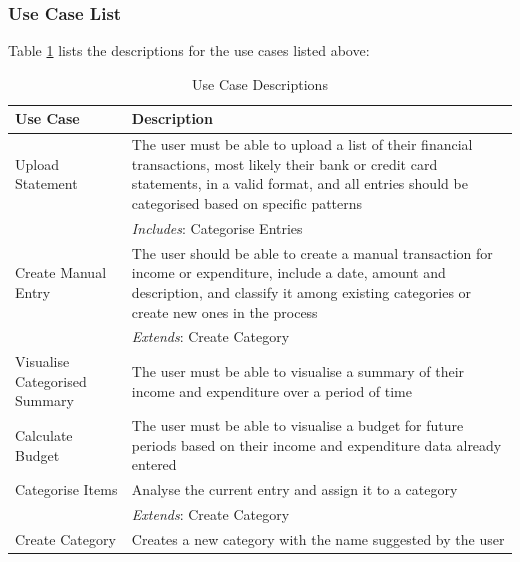 \subsubsection{Use Case List} \label{sec:Requirements.FunctionalRequirements.UseCaseList}
Table \ref{tab:UseCaseDescriptions} lists the descriptions for the use cases
listed above:
\begin{table}[ht!]
  \centering
  \begin{tabular}{|p{4cm}|p{12cm}|}
    \hline
    \textbf{Use Case}&\textbf{Description}\\
    \hline
    Upload Statement&The user must be able to upload a list of their
                     financial transactions, most likely their bank
                     or credit card statements, in a valid format, and all
                     entries should be categorised based on specific patterns\\
                    &\emph{Includes}: Categorise Entries\\
    \hline
    Create Manual Entry&The user should be able to create a manual transaction for
                        income or expenditure, include a date, amount and
                        description, and classify it among existing categories
                        or create new ones in the
                        process\\
                        &\emph{Extends}: Create Category\\
    \hline
    Visualise Categorised Summary&The user must be able to visualise
                                  a summary of their income and expenditure
                                  over a period of time\\
    \hline
    Calculate Budget&The user must be able to visualise a budget for future
                     periods based on their income and expenditure data 
                     already entered\\
    \hline
    Categorise Items&Analyse the current entry and assign it to a category\\
                    &\emph{Extends}: Create Category\\
    \hline
    Create Category&Creates a new category with the name suggested by the
                        user\\

    \hline
  \end{tabular}
  \caption{Use Case Descriptions} \label{tab:UseCaseDescriptions}
\end{table}
\FloatBarrier

